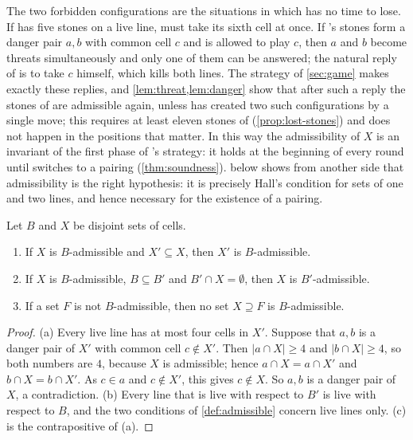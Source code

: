 The two forbidden configurations are the situations in which \Breaker{} has no time to lose. If \Maker{}
has five stones on a live line, \Breaker{} must take its sixth cell at once. If \Maker's stones form a
danger pair $a,b$ with common cell $c$ and \Maker{} is allowed to play $c$, then $a$ and $b$ become
threats simultaneously and only one of them can be answered; the natural reply of \Breaker{} is to take
$c$ himself, which kills both lines. The strategy of \cref{sec:game} makes exactly these replies, and
\cref{lem:threat,lem:danger} show that after such a reply the stones of \Maker{} are admissible again,
unless \Maker{} has created two such configurations by a single move; this requires at least eleven
stones of \Maker{} (\cref{prop:lost-stones}) and does not happen in the positions that matter. In this
way the admissibility of $X$ is an invariant of the first phase of \Breaker's strategy: it holds at the
beginning of every round until \Breaker{} switches to a pairing (\cref{thm:soundness}).
 below shows from another side that admissibility is the right hypothesis: it is precisely Hall's
condition for sets of one and two lines, and hence necessary for the existence of a pairing.

\begin{lemma}\label{lem:adm-closed}
Let $B$ and $X$ be disjoint sets of cells.
\begin{enumerate}[label=\textup{(\alph*)}]
\item If $X$ is $B$-admissible and $X'\subseteq X$, then $X'$ is $B$-admissible.
\item If $X$ is $B$-admissible, $B\subseteq B'$ and $B'\cap X=\emptyset$, then $X$ is $B'$-admissible.
\item If a set $F$ is not $B$-admissible, then no set $X\supseteq F$ is $B$-admissible.
\end{enumerate}
\end{lemma}

\begin{proof}
(a) Every live line has at most four cells in $X'$. Suppose that $a,b$ is a danger pair of $X'$ with
common cell $c\notin X'$. Then $|a\cap X|\ge 4$ and $|b\cap X|\ge 4$, so both numbers are $4$, because $X$
is admissible; hence $a\cap X=a\cap X'$ and $b\cap X=b\cap X'$. As $c\in a$ and $c\notin X'$, this gives
$c\notin X$. So $a,b$ is a danger pair of $X$, a contradiction. (b) Every line that is live with respect
to $B'$ is live with respect to $B$, and the two conditions of \cref{def:admissible} concern live lines
only. (c) is the contrapositive of (a).
\end{proof}

